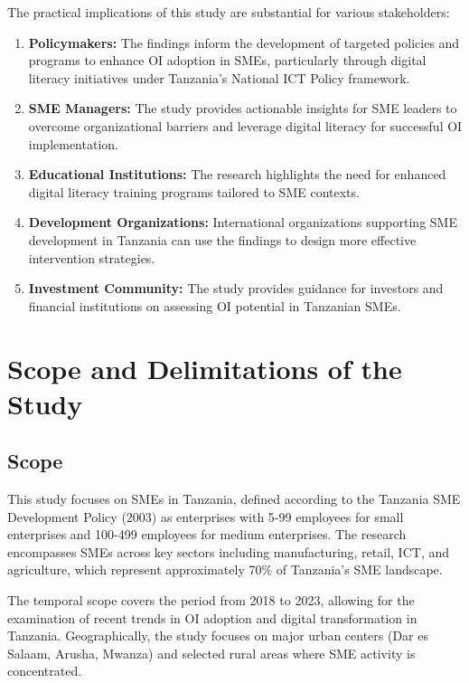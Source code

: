 The practical implications of this study are substantial for various stakeholders:

\begin{enumerate}
    \item \textbf{Policymakers:} The findings inform the development of targeted policies and programs to enhance OI adoption in SMEs, particularly through digital literacy initiatives under Tanzania's National ICT Policy framework.

    \item \textbf{SME Managers:} The study provides actionable insights for SME leaders to overcome organizational barriers and leverage digital literacy for successful OI implementation.

    \item \textbf{Educational Institutions:} The research highlights the need for enhanced digital literacy training programs tailored to SME contexts.

    \item \textbf{Development Organizations:} International organizations supporting SME development in Tanzania can use the findings to design more effective intervention strategies.

    \item \textbf{Investment Community:} The study provides guidance for investors and financial institutions on assessing OI potential in Tanzanian SMEs.
\end{enumerate}

\section{Scope and Delimitations of the Study}

\subsection{Scope}

This study focuses on SMEs in Tanzania, defined according to the Tanzania SME Development Policy (2003) as enterprises with 5-99 employees for small enterprises and 100-499 employees for medium enterprises. The research encompasses SMEs across key sectors including manufacturing, retail, ICT, and agriculture, which represent approximately 70\% of Tanzania's SME landscape.

The temporal scope covers the period from 2018 to 2023, allowing for the examination of recent trends in OI adoption and digital transformation in Tanzania. Geographically, the study focuses on major urban centers (Dar es Salaam, Arusha, Mwanza) and selected rural areas where SME activity is concentrated.

